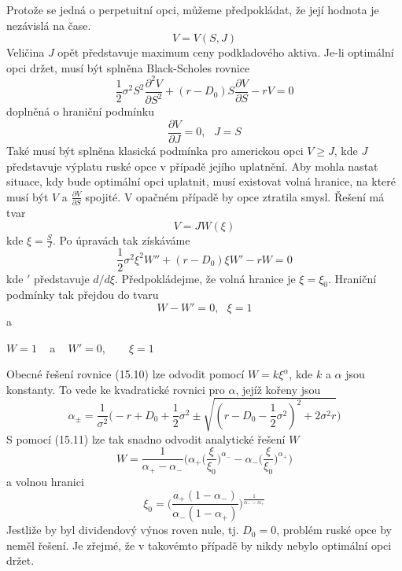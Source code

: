 \documentclass[a4paper]{book}
\begin{document}
Protože se jedná o perpetuitní opci, můžeme předpokládat, že její hodnota je nezávislá na čase.
\begin{equation*}
V = V(S,J)
\end{equation*}
Veličina $J$ opět představuje maximum ceny podkladového aktiva. Je-li optimální opci držet, musí být splněna Black-Scholes rovnice
\begin{equation*}
\frac{1}{2} \sigma^2 S^2 \frac{\partial^2 V}{\partial S^2} + (r - D_0)S \frac{\partial V}{\partial S} - rV = 0
\end{equation*}
doplněná o hraniční podmínku
\begin{equation*}
\frac{\partial V}{\partial J} = 0, ~~~ J = S
\end{equation*}
Také musí být splněna klasická podmínka pro americkou opci $V \ge J$, kde $J$ představuje výplatu ruské opce v případě jejího uplatnění. Aby mohla nastat situace, kdy bude optimální opci uplatnit, musí existovat volná hranice, na které musí být $V$ a $\frac{\partial V}{\partial S}$ spojité. V opačném případě by opce ztratila smysl. Řešení má tvar
\begin{equation*}
V = JW(\xi)
\end{equation*}
kde $\xi = \frac{S}{J}$. Po úpravách tak získáváme
\begin{equation}
\frac{1}{2} \sigma^2 \xi^2 W'' + (r - D_0) \xi W' - rW = 0
\end{equation}
kde $'$ představuje $d/d \xi$. Předpokládejme, že volná hranice je $\xi = \xi_0$. Hraniční podmínky tak přejdou do tvaru
\begin{equation*}
W - W' = 0, ~~~ \xi = 1
\end{equation*}
a
\begin{center}
$W = 1$ ~ a ~ $W' = 0$, ~~~ $\xi = 1$
\end{center}
Obecné řešení rovnice (15.10) lze odvodit pomocí $W = k \xi^{\alpha}$, kde $k$ a $\alpha$ jsou konstanty. To vede ke kvadratické rovnici pro $\alpha$, jejíž kořeny jsou
\begin{equation}
\alpha_{\pm} = \frac{1}{\sigma^2} \Bigg( -r + D_0 + \frac{1}{2}\sigma^2 \pm \sqrt{(r - D_0 - \frac{1}{2}\sigma^2)^2 + 2\sigma^2 r} \Bigg)
\end{equation}
S pomocí (15.11) lze tak snadno odvodit analytické řešení $W$
\begin{equation*}
W = \frac{1}{\alpha_{+} - \alpha_{-}} \Bigg( \alpha_{+} \Big( \frac{\xi}{\xi_0} \Big)^{\alpha_{-}} - \alpha_{-} \Big( \frac{\xi}{\xi_0}\Big)^{\alpha_{+}} \Bigg)
\end{equation*}
a volnou hranici
\begin{equation*}
\xi_0 = \Bigg( \frac{a_{+}(1 - \alpha_{-})}{\alpha_{-}(1 - \alpha_{+})} \Bigg)^{\frac{1}{\alpha_{-} - \alpha_{+}}}
\end{equation*}
Jestliže by byl dividendový výnos roven nule, tj. $D_0 = 0$, problém ruské opce by neměl řešení. Je zřejmé, že v takovémto případě by nikdy nebylo optimální opci držet.
\end{document}
